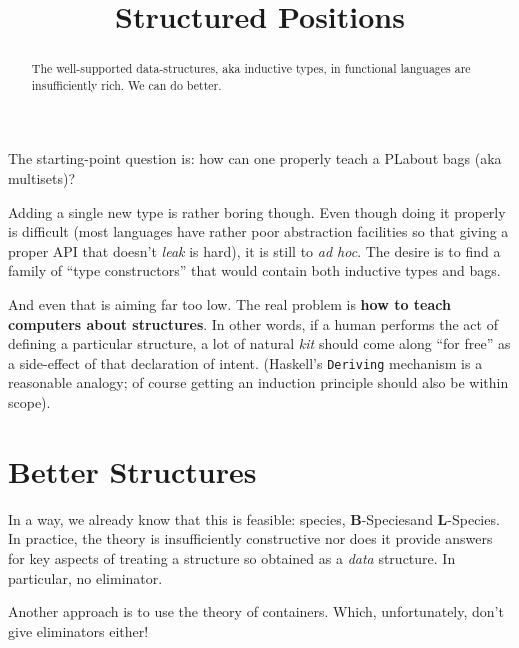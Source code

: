 \documentclass{article} -- change to whatever later
\title{Structured Positions}
\author{}
\theoremstyle{plain}
\theoremstyle{definition}
\newcommand{\PL}{PL} -- expand out later
\newcommand{\BSp}{\(\mathbf{B}\)-Species}
\newcommand{\LSp}{\(\mathbf{L}\)-Species}
\begin{document}
\maketitle
\begin{abstract}
The well-supported data-structures, aka inductive types, in functional
languages are insufficiently rich. We can do better.
\end{abstract}

The starting-point question is: how can one properly teach a \PL about
bags (aka multisets)?

Adding a single new type is rather boring though. Even though doing it
properly is difficult (most languages have rather poor abstraction facilities
so that giving a proper API that doesn't \emph{leak} is hard), it is still
to \textit{ad hoc}. The desire is to find a family of ``type constructors''
that would contain both inductive types and bags.

And even that is aiming far too low. The real problem is 
\textbf{how to teach computers about structures}. In other words, if a
human performs the act of defining a particular structure, a lot of
natural \emph{kit} should come along ``for free'' as a side-effect of
that declaration of intent. (Haskell's \texttt{Deriving} mechanism is
a reasonable analogy; of course getting an induction principle should also
be within scope).

\section{Better Structures}

In a way, we already know that this is  feasible:
species, \BSp and \LSp. In practice, the theory is insufficiently
constructive nor does it provide answers for key aspects of treating
a structure so obtained as a \emph{data} structure. In particular, no
eliminator.

Another approach is to use the theory of containers. Which, unfortunately,
don't give eliminators either!
\end{document}
